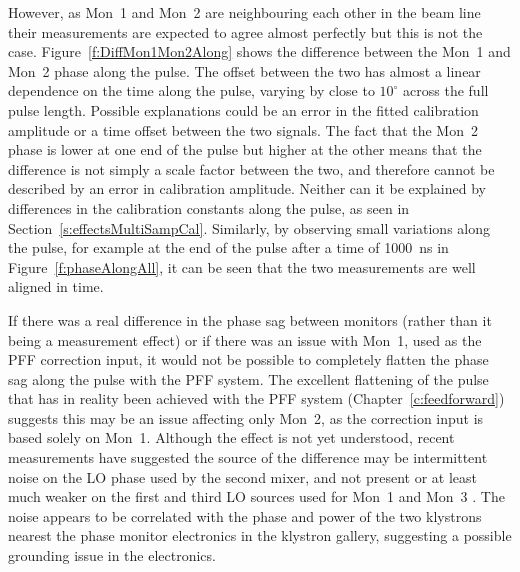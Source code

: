 However, as Mon~1 and Mon~2 are neighbouring each other in the beam line their measurements are expected to agree almost perfectly but this is not the case. Figure~\ref{f:DiffMon1Mon2Along} shows the difference between the Mon~1 and Mon~2 phase along the pulse. The offset between the two has almost a linear dependence on the time along the pulse, varying by close to \(10^\circ\) across the full pulse length. Possible explanations could be an error in the fitted calibration amplitude or a time offset between the two signals. The fact that the Mon~2 phase is lower at one end of the pulse but higher at the other means that the difference is not simply a scale factor between the two, and therefore cannot be described by an error in calibration amplitude. Neither can it be explained by differences in the calibration constants along the pulse, as seen in Section~\ref{s:effectsMultiSampCal}. Similarly, by observing small variations along the pulse, for example at the end of the pulse after a time of 1000~ns in Figure~\ref{f:phaseAlongAll}, it can be seen that the two measurements are well aligned in time.

If there was a real difference in the phase sag between monitors (rather than it being a measurement effect) or if there was an issue with Mon~1, used as the PFF correction input, it would not be possible to completely flatten the phase sag along the pulse with the PFF system. The excellent flattening of the pulse that has in reality been achieved with the PFF system (Chapter~\ref{c:feedforward}) suggests this may be an issue affecting only Mon~2, as the correction input is based solely on Mon~1. Although the effect is not yet understood, recent measurements have suggested the source of the difference may be intermittent noise on the LO phase used by the second mixer, and not present or at least much weaker on the first and third LO sources used for Mon~1 and Mon~3 \cite{jackFONTAug16}. The noise appears to be correlated with the phase and power of the two klystrons nearest the phase monitor electronics in the klystron gallery, suggesting a possible grounding issue in the electronics.


